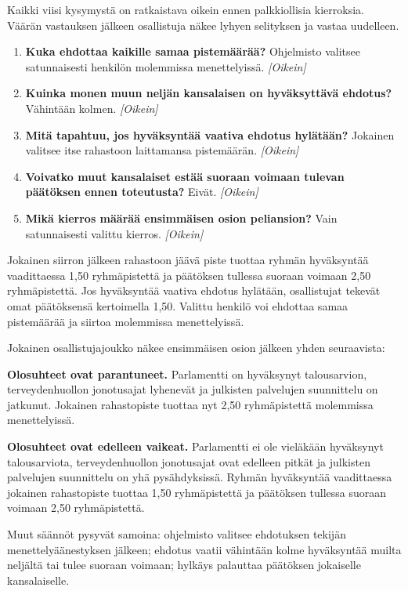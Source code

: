 Kaikki viisi kysymystä on ratkaistava oikein ennen palkkiollisia kierroksia. Väärän vastauksen jälkeen osallistuja näkee lyhyen selityksen ja vastaa uudelleen.
\begin{enumerate}
  \item \textbf{Kuka ehdottaa kaikille samaa pistemäärää?} Ohjelmisto valitsee satunnaisesti henkilön molemmissa menettelyissä. \emph{[Oikein]}
  \item \textbf{Kuinka monen muun neljän kansalaisen on hyväksyttävä ehdotus?} Vähintään kolmen. \emph{[Oikein]}
  \item \textbf{Mitä tapahtuu, jos hyväksyntää vaativa ehdotus hylätään?} Jokainen valitsee itse rahastoon laittamansa pistemäärän. \emph{[Oikein]}
  \item \textbf{Voivatko muut kansalaiset estää suoraan voimaan tulevan päätöksen ennen toteutusta?} Eivät. \emph{[Oikein]}
  \item \textbf{Mikä kierros määrää ensimmäisen osion peliansion?} Vain satunnaisesti valittu kierros. \emph{[Oikein]}
\end{enumerate}

Jokainen siirron jälkeen rahastoon jäävä piste tuottaa ryhmän hyväksyntää vaadittaessa 1,50 ryhmäpistettä ja päätöksen tullessa suoraan voimaan 2,50 ryhmäpistettä. Jos hyväksyntää vaativa ehdotus hylätään, osallistujat tekevät omat päätöksensä kertoimella 1,50. Valittu henkilö voi ehdottaa samaa pistemäärää ja siirtoa molemmissa menettelyissä.

Jokainen osallistujajoukko näkee ensimmäisen osion jälkeen yhden seuraavista:

\textbf{Olosuhteet ovat parantuneet.} Parlamentti on hyväksynyt talousarvion, terveydenhuollon jonotusajat lyhenevät ja julkisten palvelujen suunnittelu on jatkunut. Jokainen rahastopiste tuottaa nyt 2,50 ryhmäpistettä molemmissa menettelyissä.

\textbf{Olosuhteet ovat edelleen vaikeat.} Parlamentti ei ole vieläkään hyväksynyt talousarviota, terveydenhuollon jonotusajat ovat edelleen pitkät ja julkisten palvelujen suunnittelu on yhä pysähdyksissä. Ryhmän hyväksyntää vaadittaessa jokainen rahastopiste tuottaa 1,50 ryhmäpistettä ja päätöksen tullessa suoraan voimaan 2,50 ryhmäpistettä.

Muut säännöt pysyvät samoina: ohjelmisto valitsee ehdotuksen tekijän menettelyäänestyksen jälkeen; ehdotus vaatii vähintään kolme hyväksyntää muilta neljältä tai tulee suoraan voimaan; hylkäys palauttaa päätöksen jokaiselle kansalaiselle.

